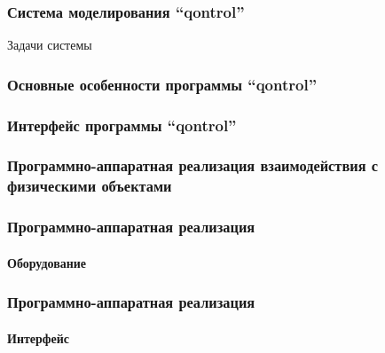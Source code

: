 \documentclass[10pt,utf8]{beamer}
\begin{document}

\begin{frame}
  \frametitle{Система моделирования ``qontrol''}

  Задачи системы


\end{frame}




\begin{frame}
  \frametitle{Основные особенности программы ``qontrol''}


\end{frame}




\begin{frame}
  \frametitle{Интерфейс программы ``qontrol''}


\end{frame}




\begin{frame}
  \frametitle{Программно-аппаратная реализация взаимодействия с физическими объектами}


\end{frame}




\begin{frame}
  \frametitle{Программно-аппаратная реализация }
  \framesubtitle{Оборудование}


\end{frame}



\begin{frame}
  \frametitle{Программно-аппаратная реализация }
  \framesubtitle{Интерфейс}


\end{frame}
\end{document}
